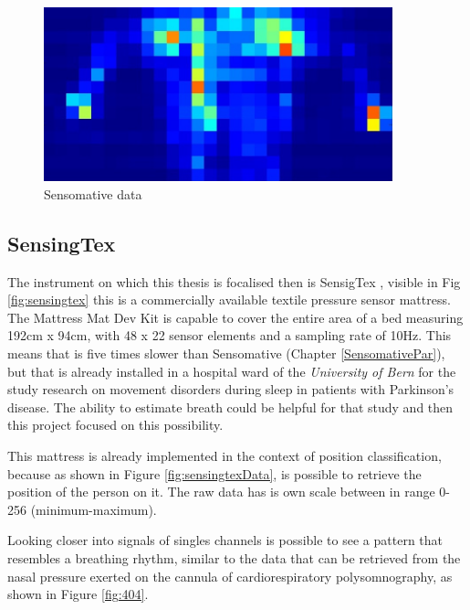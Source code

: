 \begin{figure}[H]
    \centering
    \includegraphics[width=0.9\textwidth]{img/sensomative_2.jpg}
    \caption{Sensomative data}
    \label{fig:sensomativeData}
\end{figure}
\vspace*{0.5cm}

\subsection{SensingTex} \label{SensigTexPar}
The instrument on which this thesis is focalised then is SensigTex \cite{SensingConnectivity}, visible in Fig \ref{fig:sensingtex} this is a commercially available textile pressure sensor mattress. 
The Mattress Mat Dev Kit is capable to cover the entire area of a bed measuring 192cm x 94cm, with 48 x 22 sensor elements and a sampling rate of 10Hz. This means that is five times slower than Sensomative (Chapter \ref{SensomativePar}), but that is already installed in a hospital ward of the \textit{University of Bern} for the study research on movement disorders during sleep in patients with Parkinson's disease. The ability to estimate breath could be helpful for that study and then this project focused on this possibility.

This mattress is already implemented in the context of position classification, because as shown in Figure \ref{fig:sensingtexData}, is possible to retrieve the position of the person on it. The raw data has is own scale between in range 0-256 (minimum-maximum). 

Looking closer into signals of singles channels is possible to see a pattern that resembles a breathing rhythm,  similar to the data that can
 be retrieved from the nasal pressure exerted on the cannula of cardiorespiratory polysomnography, as shown in Figure \ref{fig:404}.



